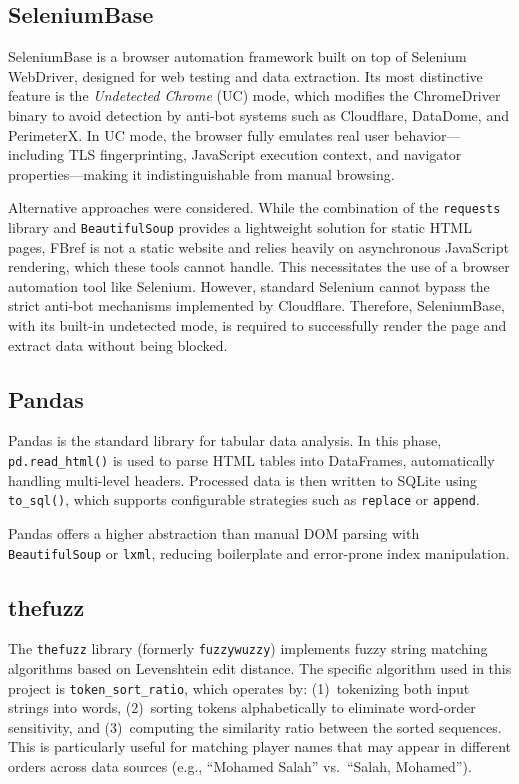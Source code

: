 \documentclass[a4paper,12pt]{report}
\begin{document}
\subsection{SeleniumBase}

SeleniumBase is a browser automation framework built on top of Selenium WebDriver, designed for web testing and data extraction. Its most distinctive feature is the \textit{Undetected Chrome} (UC) mode, which modifies the ChromeDriver binary to avoid detection by anti-bot systems such as Cloudflare, DataDome, and PerimeterX. In UC mode, the browser fully emulates real user behavior---including TLS fingerprinting, JavaScript execution context, and navigator properties---making it indistinguishable from manual browsing.

Alternative approaches were considered. While the combination of the \texttt{requests} library and \texttt{BeautifulSoup} provides a lightweight solution for static HTML pages, FBref is not a static website and relies heavily on asynchronous JavaScript rendering, which these tools cannot handle. This necessitates the use of a browser automation tool like Selenium. However, standard Selenium cannot bypass the strict anti-bot mechanisms implemented by Cloudflare. Therefore, SeleniumBase, with its built-in undetected mode, is required to successfully render the page and extract data without being blocked.

\subsection{Pandas}

Pandas is the standard library for tabular data analysis. In this phase, \texttt{pd.read\_}\allowbreak\texttt{html()} is used to parse HTML tables into DataFrames, automatically handling multi-level headers. Processed data is then written to SQLite using \texttt{to\_}\allowbreak\texttt{sql()}, which supports configurable strategies such as \texttt{replace} or \texttt{append}.

Pandas offers a higher abstraction than manual DOM parsing with \texttt{Beautiful}\allowbreak\texttt{Soup} or \texttt{lxml}, reducing boilerplate and error-\allowbreak prone index manipulation.

\subsection{thefuzz}

The \texttt{thefuzz} library (formerly \texttt{fuzzywuzzy}) implements fuzzy string matching algorithms based on Levenshtein edit distance. The specific algorithm used in this project is \texttt{token\_sort\_}\allowbreak\texttt{ratio}, which operates by: (1)~tokenizing both input strings into words, (2)~sorting tokens alphabetically to eliminate word-order sensitivity, and (3)~computing the similarity ratio between the sorted sequences. This is particularly useful for matching player names that may appear in different orders across data sources (e.g., ``Mohamed Salah'' vs.\ ``Salah, Mohamed'').
\end{document}
